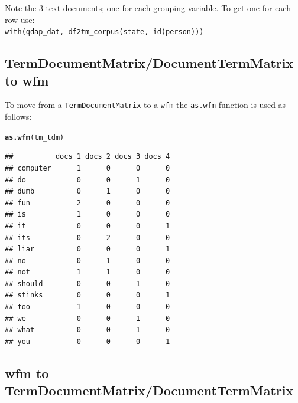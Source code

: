\documentclass{article}\usepackage[]{graphicx}\usepackage[]{color}
\makeatletter
\newcommand{\hlstd}[1]{\textcolor[rgb]{0.345,0.345,0.345}{#1}}%
\newcommand{\hlkwd}[1]{\textcolor[rgb]{0.737,0.353,0.396}{\textbf{#1}}}%
\newenvironment{kframe}{%
 \def\at@end@of@kframe{}%
 \ifinner\ifhmode%
  \def\at@end@of@kframe{\end{minipage}}%
  \begin{minipage}{\columnwidth}%
 \fi\fi%
 \def\FrameCommand##1{\hskip\@totalleftmargin \hskip-\fboxsep
 \colorbox{shadecolor}{##1}\hskip-\fboxsep
     \hskip-\linewidth \hskip-\@totalleftmargin \hskip\columnwidth}%
 \MakeFramed {\advance\hsize-\width
   \@totalleftmargin\z@ \linewidth\hsize
   \@setminipage}}%
 {\par\unskip\endMakeFramed%
 \at@end@of@kframe}
\newenvironment{knitrout}{}{} %
\makeatother
\begin{document}
\scriptsize\noindent *Note the 3 text documents; one for each grouping variable.  To get one for each row use: \\ \indent \texttt{with(qdap\_dat, df2tm\_corpus(state, id(person)))} \normalsize

\subsection{TermDocumentMatrix/DocumentTermMatrix to wfm}

\hspace{.4cm} To move from a \texttt{TermDocumentMatrix} to a \texttt{wfm} the \texttt{as.wfm} function is used as follows:

\begin{knitrout}
\color{fgcolor}\begin{kframe}
\begin{alltt}
\hlkwd{as.wfm}\hlstd{(tm_tdm)}
\end{alltt}
\end{kframe}
\end{knitrout}


\begin{knitrout}
\color{fgcolor}\begin{kframe}
\begin{verbatim}
##          docs 1 docs 2 docs 3 docs 4
## computer      1      0      0      0
## do            0      0      1      0
## dumb          0      1      0      0
## fun           2      0      0      0
## is            1      0      0      0
## it            0      0      0      1
## its           0      2      0      0
## liar          0      0      0      1
## no            0      1      0      0
## not           1      1      0      0
## should        0      0      1      0
## stinks        0      0      0      1
## too           1      0      0      0
## we            0      0      1      0
## what          0      0      1      0
## you           0      0      0      1
\end{verbatim}
\end{kframe}
\end{knitrout}



\subsection{wfm to TermDocumentMatrix/DocumentTermMatrix}
\end{document}
